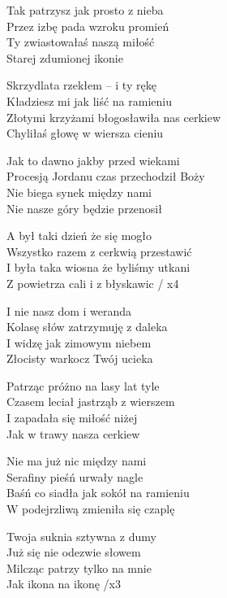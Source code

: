 \begin{textn}
    Tak patrzysz jak prosto z nieba\\
    Przez izbę pada wzroku promień\\
    Ty zwiastowałaś naszą miłość\\
    Starej zdumionej ikonie

    Skrzydlata rzekłem – i ty rękę\\
    Kładziesz mi jak liść na ramieniu\\
    Złotymi krzyżami błogosławiła nas cerkiew\\
    Chyliłaś głowę w wiersza cieniu

    \vin Jak to dawno jakby przed wiekami\\
    \vin Procesją Jordanu czas przechodził Boży\\
    \vin Nie biega synek między nami\\
    \vin Nie nasze góry będzie przenosił

    \vin A był taki dzień że się mogło\\
    \vin Wszystko razem z cerkwią przestawić\\
    \vin I była taka wiosna że byliśmy utkani\\
    \vin Z powietrza cali i z błyskawic / x4

    I nie nasz dom i weranda\\
    Kolasę słów zatrzymuję z daleka\\
    I widzę jak zimowym niebem\\
    Złocisty warkocz Twój ucieka

    Patrząc próżno na lasy lat tyle\\
    Czasem leciał jastrząb z wierszem\\
    I zapadała się miłość niżej\\
    Jak w trawy nasza cerkiew

    Nie ma już nic między nami\\
    Serafiny pieśń urwały nagle\\
    Baśń co siadła jak sokół na ramieniu\\
    W podejrzliwą zmieniła się czaplę

    Twoja suknia sztywna z dumy\\
    Już się nie odezwie słowem\\
    Milcząc patrzy tylko na mnie\\
    Jak ikona na ikonę /x3
\end{textn}
